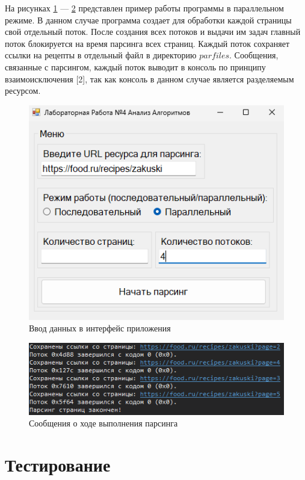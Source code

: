 На рисунках \ref{fig:3-prog} --- \ref{fig:4-prog} представлен пример работы программы в параллельном режиме. В данном случае программа создает для обработки каждой страницы свой отдельный поток. После создания всех потоков и выдачи им задач главный поток блокируется на время парсинга всех страниц. Каждый поток сохраняет ссылки на рецепты в отдельный файл в директорию $parfiles$. Сообщения, связанные с парсингом, каждый поток выводит в консоль по принципу взаимоисключения [2], так как консоль в данном случае является разделяемым ресурсом.

\begin{figure}[]
	\centering
	\includegraphics[scale=0.8]{img/3-prog.png}
	\caption{Ввод данных в интерфейс приложения}
	\label{fig:3-prog}
\end{figure}
\begin{figure}[]
	\centering
	\includegraphics[scale=0.8]{img/4-prog.png}
	\caption{Сообщения о ходе выполнения парсинга}
	\label{fig:4-prog}
\end{figure}

\clearpage

\chapter{Тестирование}

